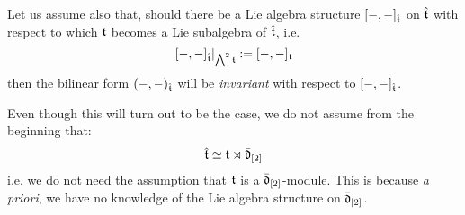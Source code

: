             \begin{convention}
                Let us assume also that, should there be a Lie algebra structure $[-, -]_{\hat{\mathfrak{t}}}$ on $\hat{\mathfrak{t}}$ with respect to which $\mathfrak{t}$ becomes a Lie subalgebra of $\hat{\mathfrak{t}}$, i.e.
                    $$[-, -]_{\hat{\mathfrak{t}}}|_{\bigwedge^2 \mathfrak{t}} := [-, -]_{\mathfrak{t}}$$
                then the bilinear form $(-, -)_{\hat{\mathfrak{t}}}$ will be \textit{invariant} with respect to $[-, -]_{\hat{\mathfrak{t}}}$.

                Even though this will turn out to be the case, we do not assume from the beginning that:
                    $$\hat{\mathfrak{t}} \simeq \mathfrak{t} \rtimes \bar{\mathfrak{d}}_{[2]}$$
                i.e. we do not need the assumption that $\mathfrak{t}$ is a $\bar{\mathfrak{d}}_{[2]}$-module. This is because \textit{a priori}, we have no knowledge of the Lie algebra structure on $\bar{\mathfrak{d}}_{[2]}$.
            \end{convention}

